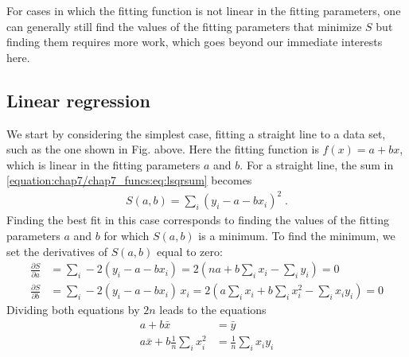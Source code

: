 \documentclass[letterpaper,10pt,english]{sphinxmanual}
\begin{document}
\sphinxAtStartPar
For cases in which the fitting function is not linear in the fitting parameters, one can generally still find the values of the fitting parameters that minimize \(S\) but finding them requires more work, which goes beyond our immediate interests here.


\subsection{Linear regression}
\label{\detokenize{chap7/chap7_funcs:linear-regression}}
\sphinxAtStartPar
We start by considering the simplest case, fitting a straight line to a data set, such as the one shown in Fig. {\hyperref[\detokenize{chap7/chap7_funcs:fig-fallingmassdataplot}]{}} above.  Here the fitting function is \(f(x) = a + bx\), which is linear in the fitting parameters \(a\) and \(b\).  For a straight line, the sum in \eqref{equation:chap7/chap7_funcs:eq:lsqrsum} becomes
\begin{equation}\label{equation:chap7/chap7_funcs:eq:linreg1}
\begin{split}S(a,b) = \sum_{i} (y_{i} - a - bx_{i})^2 \;.\end{split}
\end{equation}
\sphinxAtStartPar
Finding the best fit in this case corresponds to finding the values of the fitting parameters \(a\) and \(b\) for which \(S(a,b)\) is a minimum.  To find the minimum, we set the derivatives of \(S(a,b)\) equal to zero:
\begin{equation}\label{equation:chap7/chap7_funcs:eq:linreg2}
\begin{split}\frac{\partial S}{\partial a} &= \sum_{i}-2(y_{i}-a-bx_{i}) = 2 \left(na + b\sum_{i}x_{i} - \sum_{i}y_{i} \right) = 0 \\
\frac{\partial S}{\partial b} &= \sum_{i}-2(y_{i}-a-bx_{i})\,x_{i} = 2 \left(a\sum_{i}x_{i} + b\sum_{i}x_{i}^2 - \sum_{i}x_{i}y_{i} \right) = 0\end{split}
\end{equation}
\sphinxAtStartPar
Dividing both equations by \(2n\) leads to the equations
\begin{equation}\label{equation:chap7/chap7_funcs:eq:ablinreg}
\begin{split}a + b\bar{x} &= \bar{y}\\
a\bar{x} + b\frac{1}{n}\sum_{i}x_{i}^2  &=  \frac{1}{n}\sum_{i}x_{i}y_{i}\end{split}
\end{equation}
\sphinxAtStartPar
\end{document}
